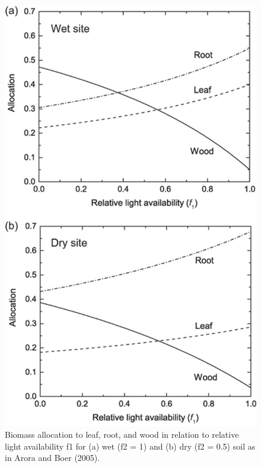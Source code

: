 \documentclass[
  12pt,
  oneside]{book}
\begin{document}
\begin{figure}

{\centering \includegraphics[width=0.8\linewidth]{figures/chap5/f58_alloc_factors} 

}

\caption{Biomass allocation to leaf, root, and wood in relation to relative light availability f1 for (a) wet (f2 = 1) and (b) dry (f2 = 0.5) soil as in Arora and Boer (2005).}\label{fig:f58}
\end{figure}
\end{document}
